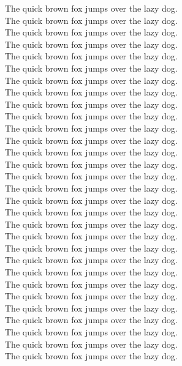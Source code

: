 The quick brown fox jumps over the lazy dog.\\
The quick brown fox jumps over the lazy dog.\\
The quick brown fox jumps over the lazy dog.\\
The quick brown fox jumps over the lazy dog.\\
The quick brown fox jumps over the lazy dog.\\
The quick brown fox jumps over the lazy dog.\\
The quick brown fox jumps over the lazy dog.\\
The quick brown fox jumps over the lazy dog.\\
The quick brown fox jumps over the lazy dog.\\
The quick brown fox jumps over the lazy dog.\\
The quick brown fox jumps over the lazy dog.\\
The quick brown fox jumps over the lazy dog.\\
The quick brown fox jumps over the lazy dog.\\
The quick brown fox jumps over the lazy dog.\\
The quick brown fox jumps over the lazy dog.\\
The quick brown fox jumps over the lazy dog.\\
The quick brown fox jumps over the lazy dog.\\
The quick brown fox jumps over the lazy dog.\\
The quick brown fox jumps over the lazy dog.\\
The quick brown fox jumps over the lazy dog.\\
The quick brown fox jumps over the lazy dog.\\
The quick brown fox jumps over the lazy dog.\\
The quick brown fox jumps over the lazy dog.\\
The quick brown fox jumps over the lazy dog.\\
The quick brown fox jumps over the lazy dog.\\
The quick brown fox jumps over the lazy dog.\\
The quick brown fox jumps over the lazy dog.\\
The quick brown fox jumps over the lazy dog.\\
The quick brown fox jumps over the lazy dog.\\
The quick brown fox jumps over the lazy dog.\\
